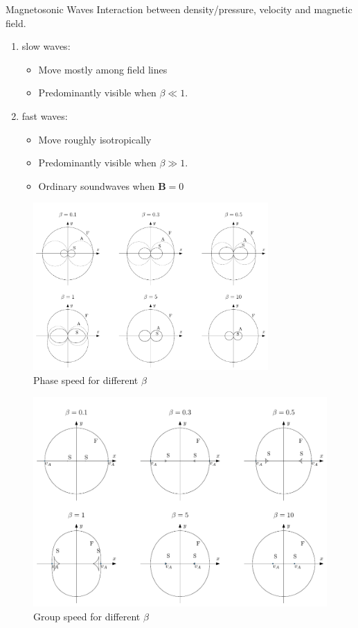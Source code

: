 \documentclass{beamer}
\begin{document}
\begin{frame}{Magnetosonic Waves}
	Interaction between density/pressure, velocity and magnetic field. 
	\begin{enumerate}
		\item slow waves:
			\begin{itemize}
				\item Move mostly among field lines
				\item Predominantly visible when $\beta \ll 1$.
			\end{itemize}
		\item fast waves:
			\begin{itemize}
				\item Move roughly isotropically 
				\item Predominantly visible when $\beta \gg 1$.
				\item Ordinary soundwaves when $\mathbf B = 0$
			\end{itemize}
	\end{enumerate}
\end{frame}
\begin{frame}
	\begin{figure}[h]
		\centering
		\includegraphics[width=0.8\textwidth]{../report/figures/fasespeed_beta.pdf}
		\caption{Phase speed for different $\beta$}	
	\end{figure}
\end{frame}
\begin{frame}
	\begin{figure}[h]
		\centering
		\includegraphics[width=.9\textwidth]{../report/figures/groupspeed_beta.pdf}
		\caption{Group speed for different $\beta$}
	\end{figure}	
\end{frame}
\end{document}
